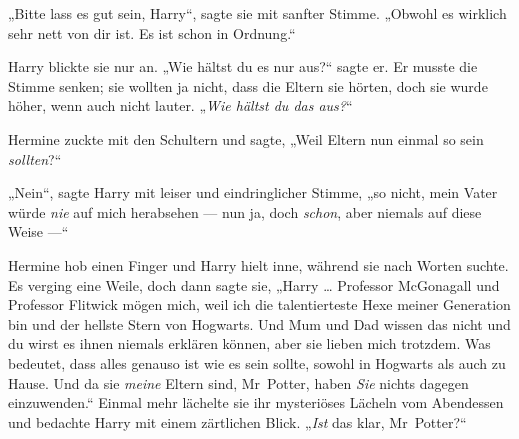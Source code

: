 „Bitte lass es gut sein, Harry“, sagte sie mit sanfter Stimme.
„Obwohl es wirklich sehr nett von dir ist. Es ist schon in Ordnung.“

Harry blickte sie nur an.
„Wie hältst du es nur aus?“ sagte er. Er musste die Stimme senken; sie wollten ja nicht, dass die Eltern sie hörten, doch sie wurde höher, wenn auch nicht lauter.
„\emph{Wie hältst du das aus?}“

Hermine zuckte mit den Schultern und sagte,
„Weil Eltern nun einmal so sein \emph{sollten}?“

„Nein“, sagte Harry mit leiser und eindringlicher Stimme, „so nicht, mein Vater würde \emph{nie} auf mich herabsehen — nun ja, doch \emph{schon}, aber niemals auf diese Weise —“

Hermine hob einen Finger und Harry hielt inne, während sie nach Worten suchte. Es verging eine Weile, doch dann sagte sie,
„Harry … Professor McGonagall und Professor Flitwick mögen mich, weil ich die talentierteste Hexe meiner Generation bin und der hellste Stern von Hogwarts. Und Mum und Dad wissen das nicht und du wirst es ihnen niemals erklären können, aber sie lieben mich trotzdem. Was bedeutet, dass alles genauso ist wie es sein sollte, sowohl in Hogwarts als auch zu Hause. Und da sie \emph{meine} Eltern sind, Mr~Potter, haben \emph{Sie} nichts dagegen einzuwenden.“ Einmal mehr lächelte sie ihr mysteriöses Lächeln vom Abendessen und bedachte Harry mit einem zärtlichen Blick.
„\emph{Ist} das klar, Mr~Potter?“

